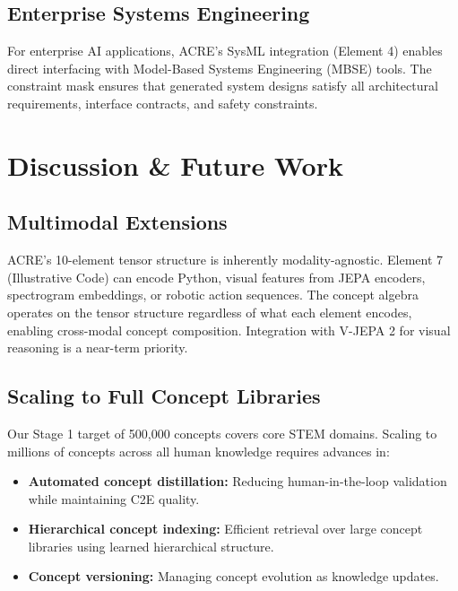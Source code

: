 \documentclass{article}
\begin{document}
\subsection{Enterprise Systems Engineering}

For enterprise AI applications, ACRE's SysML integration (Element 4) enables direct interfacing with Model-Based Systems Engineering (MBSE) tools. The constraint mask ensures that generated system designs satisfy all architectural requirements, interface contracts, and safety constraints.

\section{Discussion \& Future Work}

\subsection{Multimodal Extensions}

ACRE's 10-element tensor structure is inherently modality-agnostic. Element 7 (Illustrative Code) can encode Python, visual features from JEPA encoders, spectrogram embeddings, or robotic action sequences. The concept algebra operates on the tensor structure regardless of what each element encodes, enabling cross-modal concept composition. Integration with V-JEPA 2 for visual reasoning is a near-term priority.

\subsection{Scaling to Full Concept Libraries}

Our Stage 1 target of 500,000 concepts covers core STEM domains. Scaling to millions of concepts across all human knowledge requires advances in:
\begin{itemize}[leftmargin=*]
    \item \textbf{Automated concept distillation:} Reducing human-in-the-loop validation while maintaining C2E quality.
    \item \textbf{Hierarchical concept indexing:} Efficient retrieval over large concept libraries using learned hierarchical structure.
    \item \textbf{Concept versioning:} Managing concept evolution as knowledge updates.
\end{itemize}
\end{document}
